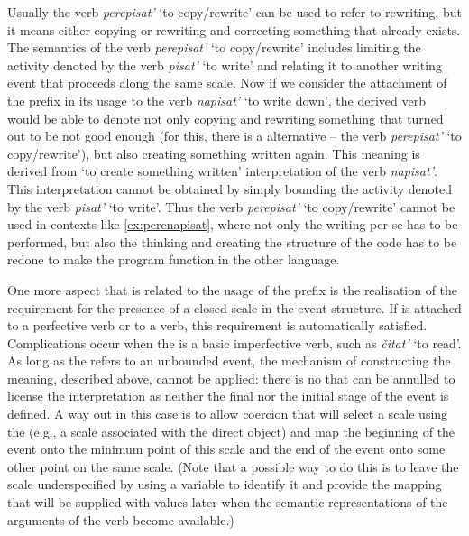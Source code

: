 Usually the verb \textit{perepisat'} `to copy/rewrite' can be used to refer to rewriting, but it means either copying or rewriting and correcting something that already exists. The semantics of the verb \textit{perepisat'} `to copy/rewrite' includes limiting the activity denoted by the verb \textit{pisat'} `to write' and relating it to another writing event that proceeds along the same scale. Now if we consider the attachment of the  prefix in its  usage to the verb \textit{napisat'} `to write down', the derived verb would be able to denote not only copying and rewriting something that turned out to be not good enough (for this, there is a  alternative -- the verb \textit{perepisat'} `to copy/rewrite'), but also creating something written again. This meaning is derived from `to create something written' interpretation of the verb \textit{napisat'}. This interpretation cannot be obtained by simply bounding the activity denoted by the verb \textit{pisat'} `to write'. Thus the verb \textit{perepisat'} `to copy/rewrite' cannot be used in contexts like \ref{ex:perenapisat}, where not only the writing per se has to be performed, but also the thinking and creating the structure of the code has to be redone to make the program function in the other language.

One more aspect that is related to the  usage of the prefix  is the realisation of the requirement for the presence of a closed scale in the event structure. If  is attached to a perfective verb or to a  verb, this requirement is automatically satisfied. Complications occur when the  is a basic imperfective verb, such as \textit{\v{c}itat'} `to read'. As long as the  refers to an unbounded event, the mechanism of constructing the  meaning, described above, cannot be applied: there is no  that can be annulled to license the  interpretation as neither the final nor the initial stage of the event is defined. A way out in this case is to allow coercion that will select a scale using the  (e.g., a scale associated with the direct object) and map the beginning of the event onto the minimum point of this scale and the end of the event onto some other point on the same scale. (Note that a possible way to do this is to leave the scale underspecified by using a variable to identify it and provide the mapping that will be supplied with values later when the semantic representations of the arguments of the verb become available.)

